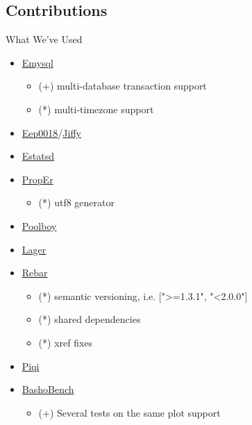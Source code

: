 \documentclass[aspectratio=169]{beamer}
\begin{document}
\subsection{Contributions}
\begin{frame}{What We've Used}
    \begin{itemize}
        \item \href{http://eonblast.github.com/Emysql}{Emysql}
            \begin{itemize}
                \item (+) multi-database transaction support
                \item (*) multi-timezone support
            \end{itemize}
        \item \href{http://github.com/davisp/eep0018}{Eep0018}/\href{http://github.com/davisp/jiffy}{Jiffy}
        \item \href{http://github.com/RJ/estatsd}{Estatsd}
        \item \href{http://github.com/manopapad/proper}{PropEr}
            \begin{itemize}
                \item (*) utf8 generator
            \end{itemize}
        \item \href{http://github.com/devinus/poolboy}{Poolboy}
        \item \href{http://github.com/basho/lager}{Lager}
        \item \href{http://github.com/basho/rebar}{Rebar}
            \begin{itemize}
                \item (*) semantic versioning, i.e. [">=1.3.1", "<2.0.0"]
                \item (*) shared dependencies
                \item (*) xref fixes
            \end{itemize}
        \item \href{http://github.com/alavrik/piqi}{Piqi}
        \item \href{http://github.com/basho/basho\_bench}{BashoBench}
            \begin{itemize}
                \item (+) Several tests on the same plot support
            \end{itemize}
    \end{itemize}
\end{frame}
\end{document}
